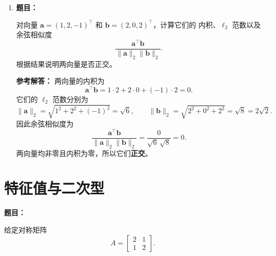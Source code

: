 \documentclass[11pt,a4paper]{article}
\newcommand{\ans}{\textcolor{answerblue}{\textbf{参考解答：}}}
\newenvironment{question}{%
  \par\begingroup\color{black!82}\noindent\textbf{题目：}\ignorespaces
}{%
  \par\endgroup\smallskip
}
\begin{document}
\begin{enumerate}
\[    =\begin{bmatrix}-1\\0\\-1\end{bmatrix}.
  \]
  最后
  \[
    X^\top(X\bm w-\bm y)
    =\begin{bmatrix}1&0&2\\2&-1&1\end{bmatrix}
     \begin{bmatrix}-1\\0\\-1\end{bmatrix}
    =\begin{bmatrix}-3\\-3\end{bmatrix}.
  \]

  \item
  \begin{question}
  对向量 $\bm a=(1,2,-1)^\top$ 和 $\bm b=(2,0,2)^\top$，计算它们的
  内积、$\ell_2$ 范数以及余弦相似度
  \[
    \frac{\bm a^\top\bm b}{\lVert\bm a\rVert_2\lVert\bm b\rVert_2}.
  \]
  根据结果说明两向量是否正交。
  \end{question}
  \ans
  两向量的内积为
  \[
    \bm a^\top\bm b=1\cdot2+2\cdot0+(-1)\cdot2=0.
  \]
  它们的 $\ell_2$ 范数分别为
  \[
    \lVert\bm a\rVert_2=\sqrt{1^2+2^2+(-1)^2}=\sqrt6,
    \qquad
    \lVert\bm b\rVert_2=\sqrt{2^2+0^2+2^2}=\sqrt8=2\sqrt2.
  \]
  因此余弦相似度为
  \[
    \frac{\bm a^\top\bm b}{\lVert\bm a\rVert_2\lVert\bm b\rVert_2}
    =\frac{0}{\sqrt6\,\sqrt8}=0.
  \]
  两向量均非零且内积为零，所以它们\textbf{正交}。
\end{enumerate}

\section{特征值与二次型}

\begin{question}
给定对称矩阵
\[
  A=\begin{bmatrix}2&1\\1&2\end{bmatrix}.
\]
\end{question}
\end{document}
